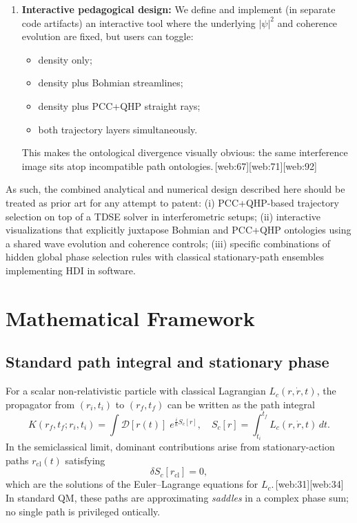 \documentclass[11pt]{article}
\begin{document}
\begin{enumerate}[leftmargin=*]
  \item \textbf{Interactive pedagogical design:} We define and implement (in separate code artifacts) an interactive tool where the underlying \(|\psi|^2\) and coherence evolution are fixed, but users can toggle:
  \begin{itemize}
    \item density only;
    \item density plus Bohmian streamlines;
    \item density plus PCC+QHP straight rays;
    \item both trajectory layers simultaneously.
  \end{itemize}
  This makes the ontological divergence visually obvious: the same interference image sits atop incompatible path ontologies.\,[web:67][web:71][web:92]
\end{enumerate}

As such, the combined analytical and numerical design described here should be treated as prior art for any attempt to patent:
(i) PCC+QHP-based trajectory selection on top of a TDSE solver in interferometric setups;
(ii) interactive visualizations that explicitly juxtapose Bohmian and PCC+QHP ontologies using a shared wave evolution and coherence controls;
(iii) specific combinations of hidden global phase selection rules with classical stationary-path ensembles implementing HDI in software.

\section{Mathematical Framework}

\subsection{Standard path integral and stationary phase}

For a scalar non-relativistic particle with classical Lagrangian \(L_c(r,\dot r,t)\), the propagator from \((r_i,t_i)\) to \((r_f,t_f)\) can be written as the path integral
\begin{equation}
K(r_f,t_f;r_i,t_i) = \int \mathcal{D}[r(t)]\; e^{\frac{i}{\hbar} S_c[r]},\quad
S_c[r] = \int_{t_i}^{t_f} L_c(r,\dot r,t)\,dt.\label{eq:path-int}
\end{equation}
In the semiclassical limit, dominant contributions arise from stationary-action paths \(r_{\text{cl}}(t)\) satisfying
\begin{equation}
\delta S_c[r_{\text{cl}}] = 0,\label{eq:classical-action}
\end{equation}
which are the solutions of the Euler--Lagrange equations for \(L_c\).\,[web:31][web:34]
In standard QM, these paths are approximating {\em saddles} in a complex phase sum; no single path is privileged ontically.
\end{document}
